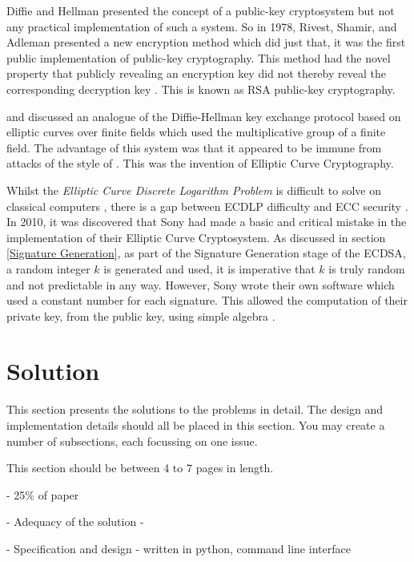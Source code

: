 \documentclass[12pt,a4paper]{article}
\begin{document}
Diffie and Hellman presented the concept of a public-key cryptosystem but not any practical implementation of such a system. 
So in 1978, Rivest, Shamir, and Adleman presented a new encryption method which did just that, it was the first public implementation of public-key cryptography. 
This method had the novel property that publicly revealing an encryption key did not thereby reveal the corresponding decryption key \cite{10.1145/359340.359342}. 
This is known as RSA public-key cryptography. 

\cite{10.1007/3-540-39799-X_31} and \cite{koblitz1987elliptic} discussed an analogue of the Diffie-Hellman key exchange protocol based on elliptic curves over finite fields which used the multiplicative group of a finite field. 
The advantage of this system was that it appeared to be immune from attacks of the style of \cite{10.1007/3-540-39799-X_31,4568001}. 
This was the invention of Elliptic Curve Cryptography. 

Whilst the \emph{Elliptic Curve Discrete Logarithm Problem} is difficult to solve on classical computers \cite{hankerson2003guide}, 
there is a gap between ECDLP difficulty and ECC security \cite{bernstein2013safecurves}. 
In 2010, it was discovered that Sony had made a basic and critical mistake in the implementation of their Elliptic Curve Cryptosystem. 
As discussed in section \ref{Signature Generation}, as part of the Signature Generation stage of the ECDSA, a random integer $k$ is generated and used, 
it is imperative that $k$ is truly random and not predictable in any way. 
However, Sony wrote their own software which used a constant number for each signature. 
This allowed the computation of their private key, from the public key, using simple algebra \cite{hotz2010console}.


\section{Solution}
This section presents the solutions to the problems in detail. 
The design and implementation details should all be placed in this section. 
You may create a number of subsections, each focussing on one issue.  

This section should be between 4 to 7 pages in length.

- 25\% of paper

- Adequacy of the solution - 

- Specification and design - written in python, command line interface
\end{document}
